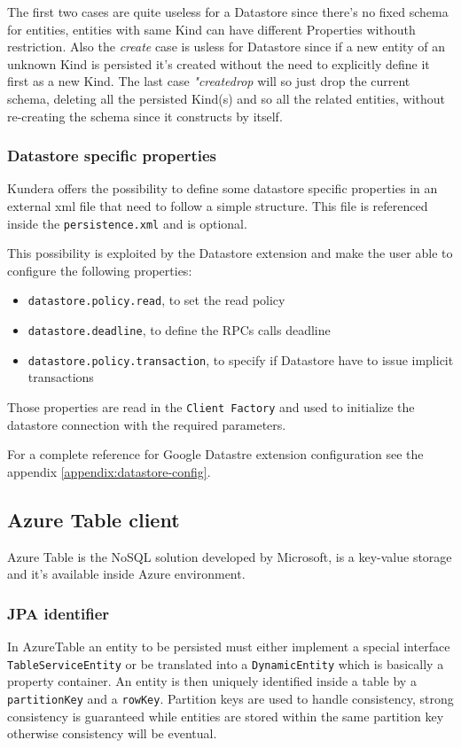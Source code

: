 \noindent The first two cases are quite useless for a Datastore since there's no fixed schema for entities, entities with same Kind can have different Properties withouth restriction.
Also the \textit{create} case is usless for Datastore since if a new entity of an unknown Kind is persisted it's created without the need to explicitly define it first as a new Kind.
The last case \textit{"create\textunderscore drop} will so just drop the current schema, deleting all the persisted Kind(s) and so all the related entities, without re-creating the schema since it constructs by itself.

\subsubsection{Datastore specific properties}
Kundera offers the possibility to define some datastore specific properties in an external xml file that need to follow a simple structure. This file is referenced inside the \texttt{persistence.xml} and is optional.

\newparagraph This possibility is exploited by the Datastore extension and make the user able to configure the following properties:
\begin{itemize}
\item \texttt{datastore.policy.read}, to set the read policy
\item \texttt{datastore.deadline}, to define the RPCs calls deadline
\item \texttt{datastore.policy.transaction}, to specify if Datastore have to issue implicit transactions
\end{itemize}
Those properties are read in the \texttt{Client Factory} and used to initialize the datastore connection with the required parameters.

\newparagraph For a complete reference for Google Datastre extension configuration see the appendix \ref{appendix:datastore-config}.

\subsection{Azure Table client}
\label{sec:kundera-table}
Azure Table \cite{online:azuretable} is the NoSQL solution developed by Microsoft, is a key-value storage and it's available inside Azure environment.

\subsubsection{JPA identifier}
In AzureTable an entity to be persisted must either implement a special interface \texttt{TableServiceEntity} or be translated into a \texttt{DynamicEntity} which is basically a property container.
An entity is then uniquely identified inside a table by a \texttt{partitionKey} and a \texttt{rowKey}.
\noindent Partition keys are used to handle consistency, strong consistency is guaranteed while entities are stored within the same partition key otherwise consistency will be eventual.

